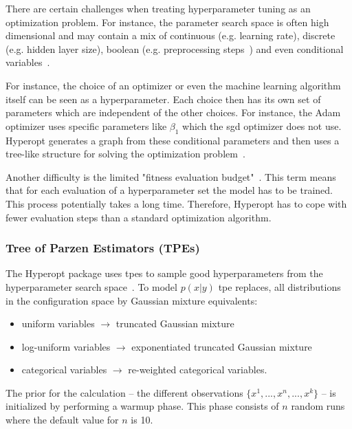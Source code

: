 There are certain challenges when treating hyperparameter tuning as an optimization problem. For instance, the parameter search space is often high dimensional and may contain a mix of continuous {(e.g. learning rate)}, discrete {(e.g. hidden layer size)}, boolean {(e.g. preprocessing steps~\cite{Hutter2009})} and even conditional variables~\cite{Bergstra2013}. 

For instance, the choice of an optimizer or even the machine learning algorithm itself can be seen as a hyperparameter. Each choice then has its own set of parameters which are independent of the other choices. For instance, the Adam optimizer uses specific parameters like $\beta_1$ which the \gls{sgd} optimizer does not use. Hyperopt generates a graph from these conditional parameters and then uses a tree-like structure for solving the optimization problem~\cite{Bergstra2011}.
\newline

Another difficulty is the limited "fitness evaluation budget"~\cite{Bergstra2011}. This term means that for each evaluation of a hyperparameter set the model has to be trained. This process potentially takes a long time. Therefore, Hyperopt has to cope with fewer evaluation steps than a standard optimization algorithm.

\subsubsection*{Tree of Parzen Estimators {(TPEs)}}
The Hyperopt package uses \glspl{tpe} to sample good hyperparameters from the hyperparameter search space~\cite{Bergstra2013a}. To model $p(x|y)$ \gls{tpe} replaces, all distributions in the configuration space by Gaussian mixture equivalents:

\begin{itemize}
	\item uniform variables $\rightarrow$ truncated Gaussian mixture
	\item log-uniform variables $\rightarrow$ exponentiated truncated Gaussian mixture
	\item categorical variables $\rightarrow$ re-weighted categorical variables.
\end{itemize}

 The prior for the calculation -- the different observations $\{x^1,..., x^n, ..., x^k\}$ -- is initialized by performing a warmup phase. This phase consists of $n$ random runs where the default value for $n$ is 10.
\medskip


